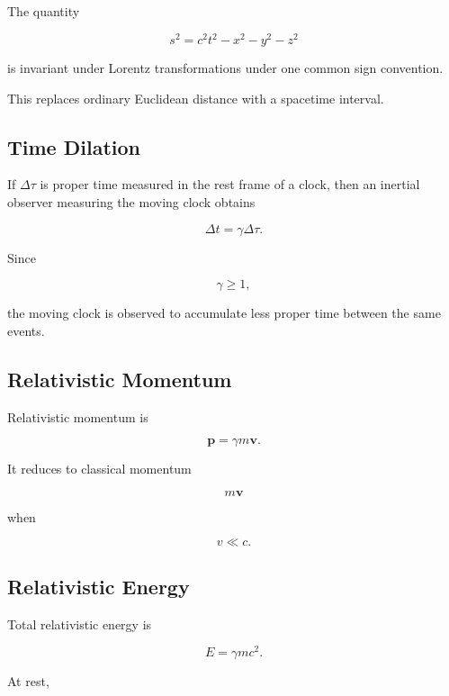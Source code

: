 The quantity

\[
\boxed{
s^2
=
c^2t^2-x^2-y^2-z^2
}
\]

is invariant under Lorentz transformations under one common sign
convention.

This replaces ordinary Euclidean distance with a spacetime interval.

\subsection{Time Dilation}
\label{subsec:time-dilation}

If \(\Delta\tau\) is proper time measured in the rest frame of a clock, then
an inertial observer measuring the moving clock obtains

\[
\boxed{
\Delta t
=
\gamma\Delta\tau.
}
\]

Since

\[
\gamma\geq1,
\]

the moving clock is observed to accumulate less proper time between the same
events.

\subsection{Relativistic Momentum}
\label{subsec:relativistic-momentum}

Relativistic momentum is

\[
\boxed{
\mathbf{p}
=
\gamma m\mathbf{v}.
}
\]

It reduces to classical momentum

\[
m\mathbf{v}
\]

when

\[
v\ll c.
\]

\subsection{Relativistic Energy}
\label{subsec:relativistic-energy}

Total relativistic energy is

\[
\boxed{
E
=
\gamma mc^2.
}
\]

At rest,

